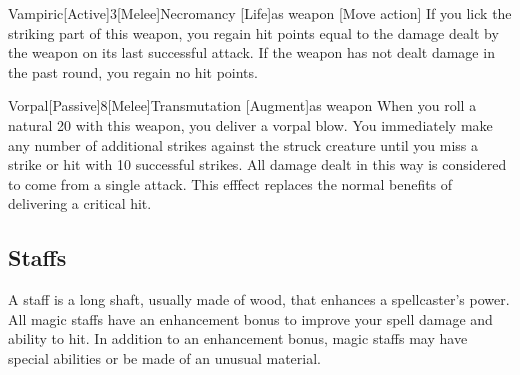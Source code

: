\begin{magicitemdef}{Vampiric}[Active]{3}[Melee]{Necromancy [Life]}{as weapon}
    [Move action] If you lick the striking part of this weapon, you regain hit points equal to the damage dealt by the weapon on its last successful attack.
    If the weapon has not dealt damage in the past round, you regain no hit points.
\end{magicitemdef}

\begin{magicitemdef}{Vorpal}[Passive]{8}[Melee]{Transmutation [Augment]}{as weapon}
     When you roll a natural 20 with this weapon, you deliver a vorpal blow.
    You immediately make any number of additional strikes against the struck creature until you miss a strike or hit with 10 successful strikes.
    All damage dealt in this way is considered to come from a single attack.
    This efffect replaces the normal benefits of delivering a critical hit.
\end{magicitemdef}

\begin{comment}
\subsection{Rods}

Rods are scepterlike devices that have unique magical powers and do not usually have charges.
Anyone can use a rod.

\parhead{Physical Description} Rods weigh approximately 5 pounds.

They range from 2 feet to 3 feet long and are usually made of iron or some other metal.
(Many, as noted in their descriptions, can function as light maces or clubs due to their sturdy construction.)

These sturdy items have AC 9, 10 hit points, hardness 10, and a break DR of 27.

\parhead{Activation} Details relating to rod use vary from item to item.
See the individual descriptions for specifics.
\end{comment}

\subsection{Staffs}

A staff is a long shaft, usually made of wood, that enhances a spellcaster's power.
All magic staffs have an enhancement bonus to improve your spell damage and ability to hit.
In addition to an enhancement bonus, magic staffs may have special abilities or be made of an unusual material.


